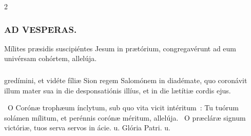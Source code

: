 \documentclass[9pt,twoside]{extarticle}
\begin{document}
\begin{multicols}{2}
{{\subsubsection*{\center \textsc{AD VESPERAS.}}
\begin{tightlist}{}
\item {} Mílites præsidis suscipiéntes Jesum in prætórium, congregavérunt ad eum univérsam cohórtem, allelúja.
\item {}
\end{tightlist}

\subsubsection*{}
gredímini, et vidéte fíliæ Sion regem Salomónem in diadémate, quo coronávit illum mater sua in die desponsatiónis illíus, et in die lætítiæ cordis ejus.

\begin{tightlist}{}
\item {}~O Corónæ trophæum ínclytum, sub quo vita vicit intéritum~: \textred{*} Tu tuórum solámen mílitum, et perénnis corónæ méritum, allelúja. ~O præcláræ signum victóriæ, tuos serva servos in ácie. u. Glória Patri. u.
\end{tightlist}

}}
\end{multicols}
\end{document}
